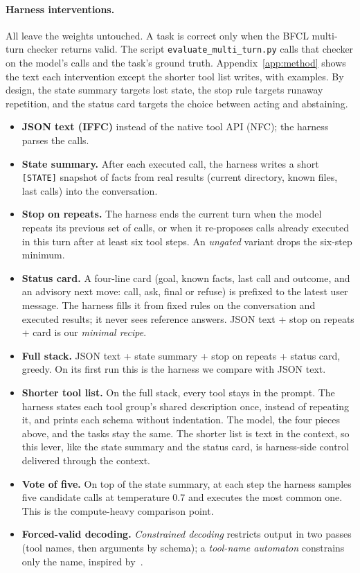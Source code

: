 \documentclass[11pt]{article}
\begin{document}
\paragraph{Harness interventions.} All leave the weights untouched. A task is correct only when the BFCL multi-turn checker returns valid. The script \texttt{evaluate\_multi\_turn.py} calls that checker on the model's calls and the task's ground truth. Appendix~\ref{app:method} shows the text each intervention except the shorter tool list writes, with examples. By design, the state summary targets lost state, the stop rule targets runaway repetition, and the status card targets the choice between acting and abstaining.
\begin{itemize}\setlength{\itemsep}{1pt}
  \item \textbf{JSON text (IFFC)} instead of the native tool API (NFC); the harness parses the calls.
  \item \textbf{State summary.} After each executed call, the harness writes a short \texttt{[STATE]} snapshot of facts from real results (current directory, known files, last calls) into the conversation.
  \item \textbf{Stop on repeats.} The harness ends the current turn when the model repeats its previous set of calls, or when it re-proposes calls already executed in this turn after at least six tool steps. An \emph{ungated} variant drops the six-step minimum.
  \item \textbf{Status card.} A four-line card (goal, known facts, last call and outcome, and an advisory next move: call, ask, final or refuse) is prefixed to the latest user message. The harness fills it from fixed rules on the conversation and executed results; it never sees reference answers. JSON text + stop on repeats + card is our \emph{minimal recipe}.
  \item \textbf{Full stack.} JSON text + state summary + stop on repeats + status card, greedy. On its first run this is the harness we compare with JSON text.
  \item \textbf{Shorter tool list.} On the full stack, every tool stays in the prompt. The harness states each tool group's shared description once, instead of repeating it, and prints each schema without indentation. The model, the four pieces above, and the tasks stay the same. The shorter list is text in the context, so this lever, like the state summary and the status card, is harness-side control delivered through the context.
  \item \textbf{Vote of five.} On top of the state summary, at each step the harness samples five candidate calls at temperature 0.7 and executes the most common one. This is the compute-heavy comparison point.
  \item \textbf{Forced-valid decoding.} \emph{Constrained decoding} restricts output in two passes (tool names, then arguments by schema); a \emph{tool-name automaton} constrains only the name, inspired by~\cite{yu2026ptc}.
\end{itemize}
\end{document}
